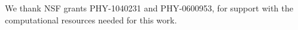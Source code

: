 \documentclass[aps,
prd,
amsmath,
amssymb,
twocolumn,
floatfix,
groupedaddress]{revtex4-1}
\begin{document}
%


\begin{acknowledgments}
We thank NSF grants PHY-1040231 and PHY-0600953, for support with the computational resources needed for this work.
\end{acknowledgments}


\end{document}
